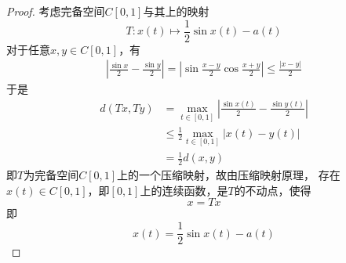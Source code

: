 \documentclass[cn]{homework}
\begin{document}
    \problem
    \begin{proof}
        考虑完备空间$C[0,1]$与其上的映射
        \[T:x(t)\mapsto\frac{1}{2}\sin x(t)-a(t)\]
        对于任意$x,y\in C[0,1]$，有
        \[\begin{aligned}
            \left|\frac{\sin x}{2}-\frac{\sin y}{2}\right|
            =\left|\sin\frac{x-y}{2}\cos\frac{x+y}{2}\right|
            \leq\frac{|x-y|}{2}
        \end{aligned}\]
        于是
        \[\begin{aligned}
        d(Tx,Ty)&=\max_{t\in[0,1]}\left|\frac{\sin x(t)}{2}-\frac{\sin y(t)}{2}\right|\\
        &\leq\frac{1}{2}\max_{t\in[0,1]}|x(t)-y(t)|\\
        &=\frac{1}{2}d(x,y)
        \end{aligned}\]
        即$T$为完备空间$C[0,1]$上的一个压缩映射，故由压缩映射原理，
        存在$x(t)\in C[0,1]$，即$[0,1]$上的连续函数，是$T$的不动点，使得
        \[x=Tx\]
        即
        \[x(t)=\frac{1}{2}\sin x(t)-a(t)\]
    \end{proof}
\end{document}
